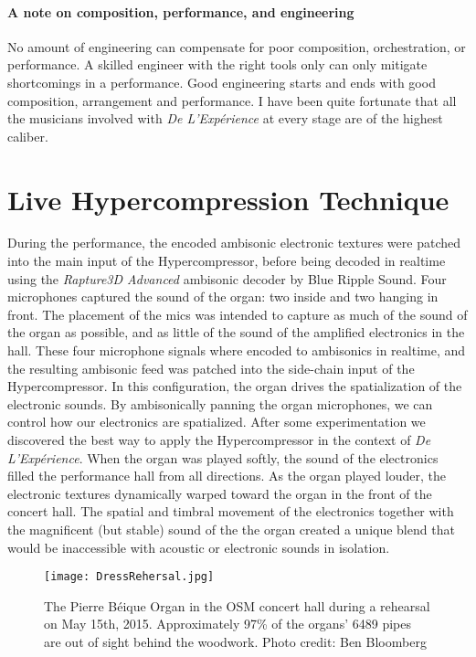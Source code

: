 \paragraph{A note on composition, performance, and engineering}
No amount of engineering can compensate for poor composition,
orchestration, or performance. A skilled engineer with the right tools
only can only mitigate shortcomings in a performance. Good engineering
starts and ends with good composition, arrangement and performance. I
have been quite fortunate that all the musicians involved with
\textit{De L'Exp\'{e}rience} at every stage are of the highest
caliber.

\section{Live Hypercompression Technique}
\label{sec:live-hyperc-techn}
During the performance, the encoded ambisonic electronic textures were
patched into the main input of the Hypercompressor, before being
decoded in realtime using the \textit{Rapture3D Advanced} ambisonic
decoder by Blue Ripple
Sound.
Four microphones captured the sound of the organ: two inside and two
hanging in front. The placement of the mics was intended to capture as
much of the sound of the organ as possible, and as little of the sound
of the amplified electronics in the hall. These four microphone
signals where encoded to ambisonics in realtime, and the resulting
ambisonic feed was patched into the side-chain input of the
Hypercompressor. In this configuration, the organ drives the
spatialization of the electronic sounds. By ambisonically panning the
organ microphones, we can control how our electronics are
spatialized. After some experimentation we discovered the best way to
apply the Hypercompressor in the context of \textit{De
  L'Exp\'{e}rience}. When the organ was played softly, the sound of
the electronics filled the performance hall from all directions. As
the organ played louder, the electronic textures dynamically warped
toward the organ in the front of the concert hall. The spatial and
timbral movement of the electronics together with the magnificent (but
stable) sound of the the organ created a unique blend that would be
inaccessible with acoustic or electronic sounds in isolation.

\begin{figure*}[]
  \texttt{[image: DressRehersal.jpg]}
  \caption{The Pierre B\'{e}ique Organ in the OSM concert hall during
    a rehearsal on May 15th, 2015. Approximately 97\% of the organs'
    6489 pipes are out of sight behind the woodwork. Photo credit: Ben
    Bloomberg}
  \label{fig:le-corbusier-sketch}
\end{figure*}



